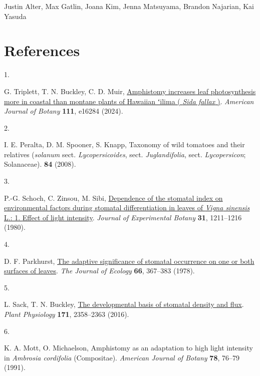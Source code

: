 \documentclass[
  letterpaper,
  DIV=11,
  numbers=noendperiod]{scrartcl}
\newlength{\cslhangindent}
\newlength{\csllabelwidth}
\newenvironment{CSLReferences}[2] %
 {\begin{list}{}{%
  \setlength{\itemindent}{0pt}
  \setlength{\leftmargin}{0pt}
  \setlength{\parsep}{0pt}
  \ifodd #1
   \setlength{\leftmargin}{\cslhangindent}
   \setlength{\itemindent}{-1\cslhangindent}
  \fi
  \setlength{\itemsep}{#2\baselineskip}}}
 {\end{list}}
\newcommand{\CSLLeftMargin}[1]{\parbox[t]{\csllabelwidth}{\strut#1\strut}}
\newcommand{\CSLRightInline}[1]{\parbox[t]{\linewidth - \csllabelwidth}{\strut#1\strut}}
\begin{document}
Justin Alter, Max Gatlin, Joana Kim, Jenna Matsuyama, Brandon Najarian,
Kai Yasuda

\section*{References}\label{references}

\label{refs}
\begin{CSLReferences}{0}{1}
\CSLLeftMargin{1. }%
\CSLRightInline{G. Triplett, T. N. Buckley, C. D. Muir,
\href{https://doi.org/10.1002/ajb2.16284}{Amphistomy increases leaf
photosynthesis more in coastal than montane plants of {Hawaiian} ʻilima
( \emph{{Sida} fallax} )}. \emph{American Journal of Botany}
\textbf{111}, e16284 (2024).}

\CSLLeftMargin{2. }%
\CSLRightInline{I. E. Peralta, D. M. Spooner, S. Knapp, Taxonomy of wild
tomatoes and their relatives (\emph{solanum} sect.
\emph{Lycopersicoides}, sect. \emph{Juglandifolia}, sect.
\emph{Lycopersicon}; {Solanaceae}). \textbf{84} (2008).}

\CSLLeftMargin{3. }%
\CSLRightInline{P.-G. Schoch, C. Zinsou, M. Sibi,
\href{https://doi.org/10.1093/jxb/31.5.1211}{Dependence of the stomatal
index on environmental factors during stomatal differentiation in leaves
of \emph{{Vigna} sinensis} {L}.: 1. {Effect} of light intensity}.
\emph{Journal of Experimental Botany} \textbf{31}, 1211--1216 (1980).}

\CSLLeftMargin{4. }%
\CSLRightInline{D. F. Parkhurst,
\href{https://doi.org/10.2307/2259142}{The adaptive significance of
stomatal occurrence on one or both surfaces of leaves}. \emph{The
Journal of Ecology} \textbf{66}, 367--383 (1978).}

\CSLLeftMargin{5. }%
\CSLRightInline{L. Sack, T. N. Buckley,
\href{https://doi.org/10.1104/pp.16.00476}{The developmental basis of
stomatal density and flux}. \emph{Plant Physiology} \textbf{171},
2358--2363 (2016).}

\CSLLeftMargin{6. }%
\CSLRightInline{K. A. Mott, O. Michaelson, Amphistomy as an adaptation
to high light intensity in \emph{{Ambrosia} cordifolia} ({Compositae}).
\emph{American Journal of Botany} \textbf{78}, 76--79 (1991).}


\end{CSLReferences}
\end{document}
